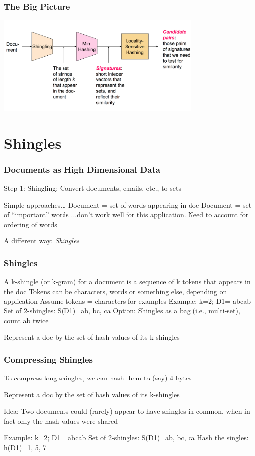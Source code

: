 \documentclass[svgnames]{beamer}
\begin{document}
  
\begin{frame} \frametitle{The Big Picture}

\includegraphics[width=10cm]{overall}

\end{frame}

  
\section{Shingles}

  
\begin{frame} \frametitle{Documents as High Dimensional Data}

Step 1: Shingling: Convert documents, emails, etc., to sets

Simple approaches...
   Document = set of words appearing in doc
   Document = set of “important” words
...don’t work well for this application.
   Need to account for ordering of words

A different way: \emph{Shingles}

\end{frame}

  
\begin{frame} \frametitle{Shingles}

A k-shingle (or k-gram) for a document is a sequence of k tokens that appears in the doc
  Tokens can be characters, words or something else, depending on application
  Assume tokens = characters for examples
Example: k=2; D1= abcab
  Set of 2-shingles: S(D1)={ab, bc, ca}
  Option: Shingles as a bag (i.e., multi-set), count ab twice

Represent a doc by the set of hash values of its k-shingles

\end{frame}

  
\begin{frame} \frametitle{Compressing Shingles}

To compress long shingles, we can hash them to (say) 4 bytes

Represent a doc by the set of hash values of its k-shingles

Idea: Two documents could (rarely) appear to have shingles in common, when in fact only the hash-values were shared

Example: k=2; D1= abcab
  Set of 2-shingles: S(D1)={ab, bc, ca} 
  Hash the singles: h(D1)={1, 5, 7}

\end{frame}
\end{document}
